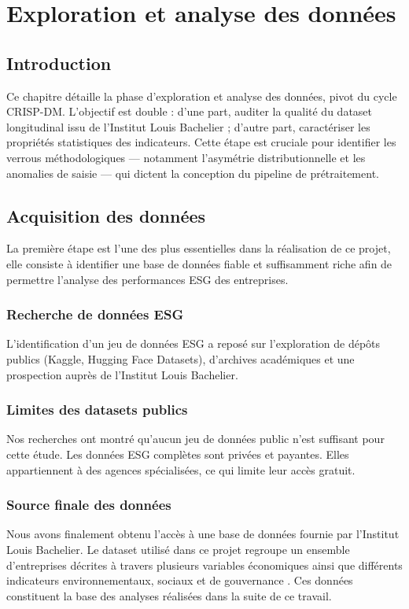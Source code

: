 \chapter{Exploration et analyse des données}

\section*{Introduction}
Ce chapitre détaille la phase d'exploration et analyse des données, pivot du cycle CRISP-DM. L’objectif est double : d’une part, auditer la qualité du dataset longitudinal issu de l’Institut Louis Bachelier ; d’autre part, caractériser les propriétés statistiques des indicateurs. Cette étape est cruciale pour identifier les verrous méthodologiques — notamment l'asymétrie distributionnelle et les anomalies de saisie — qui dictent la conception du pipeline de prétraitement.

\section{Acquisition des données}
La première étape est l’une des plus essentielles dans la réalisation de ce projet, elle consiste à identifier une base de données fiable et suffisamment riche afin de permettre l’analyse des performances ESG des entreprises.

\subsection{Recherche de données ESG}
L'identification d'un jeu de données ESG a reposé sur l'exploration de dépôts publics (Kaggle, Hugging Face Datasets), d'archives académiques et une prospection auprès de l'Institut Louis Bachelier.
\subsection{Limites des datasets publics}
 Nos recherches ont montré qu'aucun jeu de données public n'est suffisant pour cette étude. Les données ESG complètes sont privées et payantes. Elles appartiennent à des agences spécialisées, ce qui limite leur accès gratuit. 
\subsection{Source finale des données}
Nous avons finalement obtenu l’accès à une base de données fournie par l’Institut Louis Bachelier. Le dataset utilisé dans ce projet regroupe un ensemble d’entreprises décrites à travers plusieurs variables économiques ainsi que différents indicateurs environnementaux, sociaux et de gouvernance . Ces données constituent la base des analyses réalisées dans la suite de ce travail.
